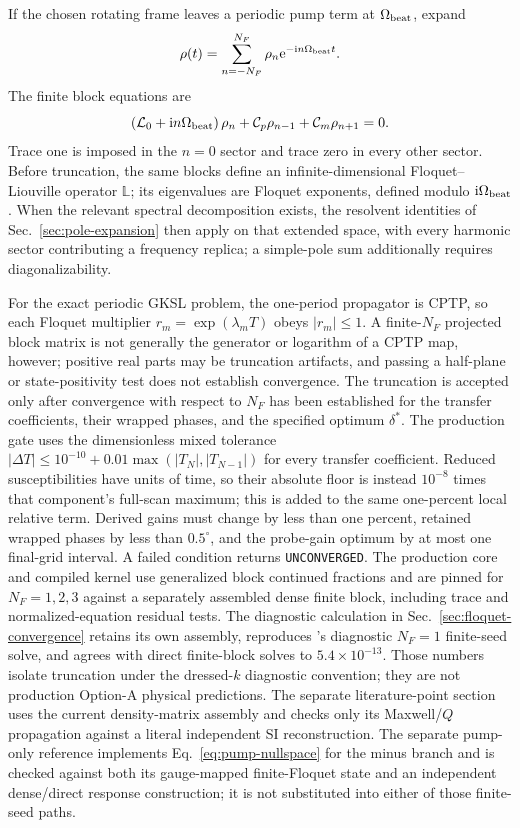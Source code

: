 \documentclass[11pt,a4paper]{article}
\newcommand{\ii}{\mathrm i}
\newcommand{\e}{\mathrm e}
\begin{document}
If the chosen rotating frame leaves a periodic pump term at
$\Omega_{\rm beat}$, expand
\[
\rho(t)=\sum_{n=-N_F}^{N_F}\rho_n\e^{-\ii n\Omega_{\rm beat}t}.
\]
The finite block equations are
\begin{equation}
\left(\mathcal L_0+\ii n\Omega_{\rm beat}\right)\rho_n
+\mathcal C_p\rho_{n-1}+\mathcal C_m\rho_{n+1}=0 .
\label{eq:floquet-block}
\end{equation}
Trace one is imposed in the $n=0$ sector and trace zero in every other sector.
Before truncation, the same blocks define an infinite-dimensional
Floquet--Liouville operator $\mathbb L$; its eigenvalues are Floquet exponents,
defined modulo $\ii\Omega_{\rm beat}$. When the relevant spectral decomposition
exists, the resolvent identities of Sec.~\ref{sec:pole-expansion} then apply on
that extended space, with every harmonic sector contributing a frequency
replica; a simple-pole sum additionally requires diagonalizability.

For the exact periodic GKSL problem, the one-period propagator is CPTP, so each
Floquet multiplier $r_m=\exp(\lambda_mT)$ obeys $|r_m|\leq1$. A finite-$N_F$
projected block matrix is not generally the generator or logarithm of a CPTP
map, however; positive real parts may be truncation artifacts, and passing a
half-plane or state-positivity test does not establish convergence. The
truncation is accepted only after convergence with respect to $N_F$ has been
established for the transfer coefficients, their wrapped phases, and the
specified optimum $\delta^*$.
The production gate uses the dimensionless mixed tolerance
$|\Delta T|\leq10^{-10}+0.01\max(|T_N|,|T_{N-1}|)$ for every transfer
coefficient. Reduced susceptibilities have units of time, so their absolute
floor is instead $10^{-8}$ times that component's full-scan maximum; this is
added to the same one-percent local relative term. Derived gains must change by
less than one percent, retained wrapped phases by less than $0.5^\circ$, and the
probe-gain optimum by at most one final-grid interval. A failed condition returns
\texttt{UNCONVERGED}.
The production core and compiled kernel use generalized block continued
fractions and are pinned for $N_F=1,2,3$ against a separately assembled dense
finite block, including trace and normalized-equation residual tests. The
diagnostic calculation in Sec.~\ref{sec:floquet-convergence} retains its own
assembly, reproduces 's diagnostic $N_F=1$ finite-seed
solve, and agrees with direct finite-block solves to $5.4\times10^{-13}$. Those
numbers isolate truncation under the dressed-$k$ diagnostic convention; they are not production
Option-A physical predictions. The separate literature-point section uses the
current density-matrix assembly and checks only its Maxwell/$Q$ propagation
against a literal independent SI reconstruction. The separate pump-only
reference implements Eq.~\eqref{eq:pump-nullspace} for the minus branch and is
checked against both its gauge-mapped finite-Floquet state and an independent
dense/direct response construction; it is not substituted into either of those
finite-seed paths.
\end{document}
